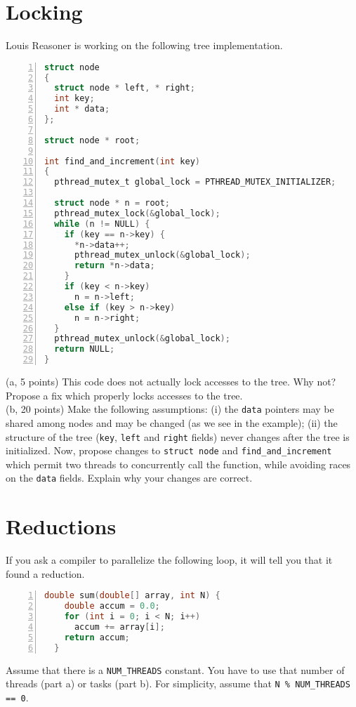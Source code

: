 \documentclass[12pt]{article}
\begin{document}
\section{Locking}
Louis Reasoner is working on the following tree implementation.
\begin{lstlisting}[language=C,numbers=left,numberstyle=\tiny]
struct node
{
  struct node * left, * right;
  int key; 
  int * data;
};

struct node * root;

int find_and_increment(int key)
{
  pthread_mutex_t global_lock = PTHREAD_MUTEX_INITIALIZER;

  struct node * n = root;
  pthread_mutex_lock(&global_lock);
  while (n != NULL) {
    if (key == n->key) {
      *n->data++;
      pthread_mutex_unlock(&global_lock);
      return *n->data;
    }
    if (key < n->key)
      n = n->left;
    else if (key > n->key)
      n = n->right;
  }
  pthread_mutex_unlock(&global_lock);
  return NULL;
}
\end{lstlisting}

\noindent
(a, 5 points) This code does not actually lock accesses to the tree. Why not? 
Propose a fix which properly locks accesses to the tree.\\[1em]
(b, 20 points) Make the following assumptions: (i) the {\tt data} pointers may be shared among nodes and
may be changed (as we see in the example); (ii) the structure of the tree ({\tt key}, {\tt left} and {\tt right} fields) 
never changes
after the tree is initialized. Now, propose changes to {\tt struct node} and {\tt find\_and\_increment} which permit
two threads to concurrently call the function, while avoiding races on the {\tt data} fields. Explain why your changes are correct.

\newpage
\section{Reductions}

If you ask a compiler to parallelize the following loop, it will tell you that it found a reduction.
\begin{lstlisting}[language=C,numbers=left,numberstyle=\tiny]
  double sum(double[] array, int N) {
    double accum = 0.0;
    for (int i = 0; i < N; i++)
      accum += array[i];
    return accum;
  }
\end{lstlisting}

Assume that there is a {\tt NUM\_THREADS} constant. You have to use that number
of threads (part a) or tasks (part b). For simplicity, assume that \verb+N % NUM_THREADS == 0+.\\
\end{document}

